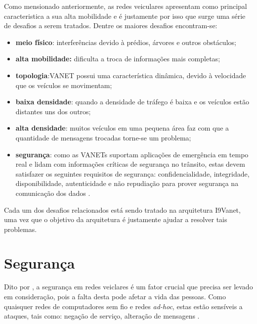\documentclass[
	12pt,				%
	oneside,			%
	a4paper,			%
	english,			%
	brazil				%
	]{abntex2ppgsi}
\begin{document}

Como mensionado anteriormente, as redes veiculares apresentam como principal caracteristica a sua alta mobilidade e é justamente por isso que surge uma série de desafios a serem tratados. Dentre os maiores desafios encontram-se:

\begin{itemize}
	\item{\textbf{meio físico}: interferências devido à prédios,  árvores e outros obstáculos;}
	\item{\textbf{alta mobilidade:} dificulta a troca de informações mais completas; }
	\item{\textbf{topologia}:VANET possui uma característica dinâmica, devido à velocidade que os veículos se movimentam;}	
	\item{\textbf{baixa densidade}: quando a densidade de tráfego é baixa e os veículos estão distantes uns dos outros;}
	\item{\textbf{alta densidade}: muitos veículos em uma pequena área faz com que a quantidade de mensagens trocadas torne-se um problema;}
	\item{\textbf{segurança}: como as VANETs suportam aplicações de emergência em tempo real e lidam com informações	críticas de segurança no trânsito, estas devem satisfazer os seguintes requisitos de segurança: confidencialidade, integridade, disponibilidade, autenticidade e não repudiação para prover segurança na comunicação dos dados \cite{samara2010security} \cite{matos2013analise}.}
	
\end{itemize} 

Cada um dos desafios relacionados está sendo tratado na arquitetura I9Vanet, uma vez que o objetivo da arquitetura é justamente ajudar a resolver tais problemas.


\section{Segurança}

Dito por , a segurança em redes veiclares é um fator crucial que precisa ser levado em consideração, pois a falta desta pode afetar a vida das pessoas. Como quaisquer redes de computadores sem fio e redes \textit{ad-hoc}, estas estão sensíveis a ataques, tais como: 	negação de serviço, alteração de mensagens \cite{raya2006securing}.
\end{document}
